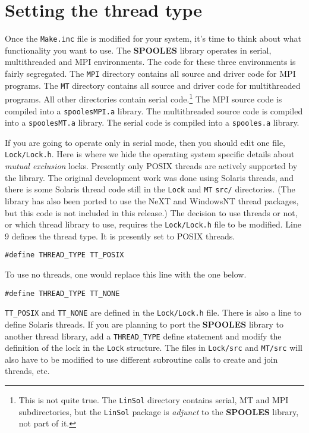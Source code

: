 \par
\section{Setting the thread type}
\par
Once the {\tt Make.inc} file is modified for your system, it's time
to think about what functionality you want to use.
The {\bf SPOOLES} library operates in serial, multithreaded and MPI
environments.
The code for these three environments is fairly segregated.
The {\tt MPI} directory contains all source and driver code for MPI
programs.
The {\tt MT} directory contains all source and driver code 
for multithreaded programs.
All other directories contain serial code.\footnote{
This is not quite true.
The {\tt LinSol} directory contains serial, MT and MPI subdirectories,
but the {\tt LinSol} package is {\it adjunct} to the {\bf SPOOLES}
library, not part of it.}
The MPI source code is compiled into a {\tt spoolesMPI.a} library.
The multithreaded source code is compiled into a {\tt spoolesMT.a} 
library.
The serial code is compiled into a {\tt spooles.a} library.
\par
If you are going to operate only in serial mode, then you should edit
one file, {\tt Lock/Lock.h}.
Here is where we hide the operating system specific details about
{\it mutual exclusion} locks.
Presently only POSIX threads are actively supported by the library.
The original development work was done using Solaris threads, and
there is some Solaris thread code still in the {\tt Lock} and
{\tt MT} {\tt src/} directories.
(The library has also been ported to use the NeXT and WindowsNT
thread packages, but this code is not included in this release.)
The decision to use threads or not, or which thread library to use,
requires the {\tt Lock/Lock.h} file to be modified.
Line 9 defines the thread type. It is presently set to POSIX threads.
\begin{verbatim}
#define THREAD_TYPE TT_POSIX
\end{verbatim}
To use no threads, one would replace this line with the one below.
\begin{verbatim}
#define THREAD_TYPE TT_NONE
\end{verbatim}
{\tt TT\_POSIX} and {\tt TT\_NONE} are defined in the {\tt Lock/Lock.h}
file.
There is also a line to define Solaris threads.
If you are planning to port the {\bf SPOOLES} library to another 
thread library, add a {\tt THREAD\_TYPE} define statement and
modify the definition of the lock in the {\tt Lock} structure.
The files in {\tt Lock/src} and {\tt MT/src} will also have to be
modified to use different subroutine calls to create and join
threads, etc.
\par
